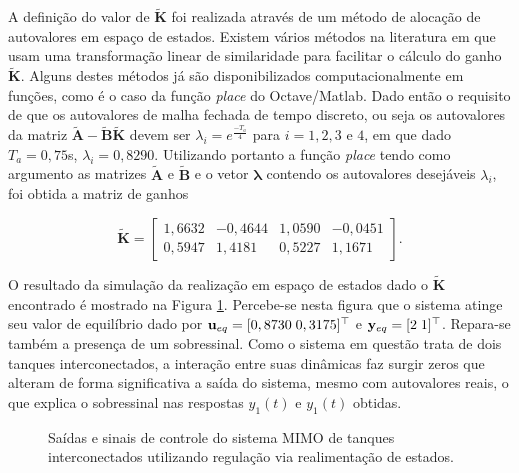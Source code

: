 A definição do valor de $\mathbf{\tilde{K}}$ foi realizada através de um método
de alocação de autovalores em espaço de estados. Existem vários métodos na
literatura em que usam uma transformação linear de similaridade para facilitar o
cálculo do ganho $\mathbf{\tilde{K}}$. Alguns destes métodos já são
disponibilizados computacionalmente em funções, como é o caso da função
\textit{place} do Octave/Matlab. Dado então o requisito de que os autovalores de
malha fechada de tempo discreto, ou seja os autovalores da matriz
$\mathbf{\tilde{A} - \tilde{B}\tilde{K}}$ devem ser $\lambda_i =
e^{\frac{-T_a}{4}}$ para $i = 1, 2, 3$ e $4$, em que dado $T_a = 0,75$s,
$\lambda_i = 0,8290$. Utilizando portanto a função \textit{place} tendo como
argumento as matrizes $\mathbf{\tilde{A}}$ e $\mathbf{\tilde{B}}$ e o vetor
$\mathbf{\lambda}$ contendo os autovalores desejáveis $\lambda_i$, foi obtida a
matriz de ganhos

\begin{equation}
    \label{eq:matriz-de-ganhos-discreto}
    \mathbf{\tilde{K}} = 
    \begin{bmatrix}
        1,6632 & -0,4644 & 1,0590 & -0,0451    \\
        0,5947 & 1,4181 &  0,5227 & 1,1671
    \end{bmatrix}.
\end{equation}

O resultado da simulação da realização em espaço de estados dado o
$\mathbf{\tilde{K}}$ encontrado é mostrado na Figura
\ref{fig:resultado-do-regulador-via-realimentacao-de-estados}. Percebe-se nesta
figura que o sistema atinge seu valor de equilíbrio dado por $\mathbf{u}_{eq} =
[0,8730 \thickspace 0,3175]^\top$ e $\mathbf{y}_{eq} = [2 \thickspace 1]^\top$.
Repara-se também a presença de um sobressinal. Como o sistema em questão trata
de dois tanques interconectados, a interação entre suas dinâmicas faz surgir
zeros que alteram de forma significativa a saída do sistema, mesmo com
autovalores reais, o que explica o sobressinal nas respostas $y_1(t)$ e $y_1(t)$
obtidas.

\begin{figure}[!htp]
    \caption{Saídas e sinais de controle do sistema MIMO de tanques
    interconectados utilizando regulação via realimentação de estados.}
    \vspace{-10pt}
    \hspace{-30pt}
    \label{fig:resultado-do-regulador-via-realimentacao-de-estados}
    \begin{minipage}{\linewidth}
        
    \end{minipage}
\end{figure}

